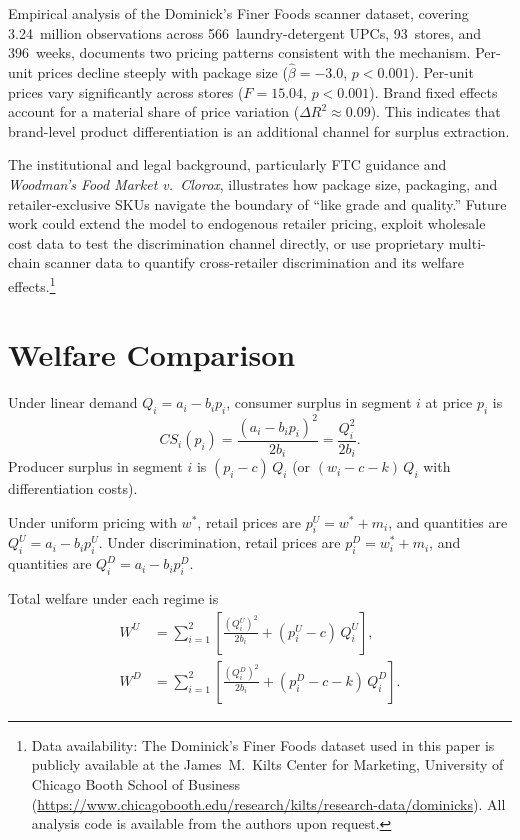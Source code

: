 \documentclass[12pt]{article}
\theoremstyle{definition}
\begin{document}
Empirical analysis of the Dominick's Finer Foods scanner dataset, covering 3.24~million observations across 566~laundry-detergent UPCs, 93~stores, and 396~weeks, documents two pricing patterns consistent with the mechanism.
Per-unit prices decline steeply with package size ($\hat{\beta} = -3.0$, $p < 0.001$).
Per-unit prices vary significantly across stores ($F = 15.04$, $p < 0.001$).
Brand fixed effects account for a material share of price variation ($\Delta R^2 \approx 0.09$). This indicates that brand-level product differentiation is an additional channel for surplus extraction.

The institutional and legal background, particularly FTC guidance and \textit{Woodman's Food Market v.\ Clorox}, illustrates how package size, packaging, and retailer-exclusive SKUs navigate the boundary of ``like grade and quality.''
Future work could extend the model to endogenous retailer pricing, exploit wholesale cost data to test the discrimination channel directly, or use proprietary multi-chain scanner data to quantify cross-retailer discrimination and its welfare effects.\footnote{Data availability: The Dominick's Finer Foods dataset used in this paper is publicly available at the James~M.\ Kilts Center for Marketing, University of Chicago Booth School of Business (\url{https://www.chicagobooth.edu/research/kilts/research-data/dominicks}). All analysis code is available from the authors upon request.}


\appendix

\section{Welfare Comparison}\label{app:welfare}

Under linear demand $Q_i = a_i - b_i p_i$, consumer surplus in segment $i$ at price $p_i$ is
\begin{equation}\label{eq:cs}
CS_i(p_i) = \frac{(a_i - b_i p_i)^2}{2b_i} = \frac{Q_i^2}{2b_i}.
\end{equation}
Producer surplus in segment $i$ is $(p_i - c)\,Q_i$ (or $(w_i - c - k)\,Q_i$ with differentiation costs).

Under uniform pricing with $w^*$, retail prices are $p_i^U = w^* + m_i$, and quantities are $Q_i^U = a_i - b_i p_i^U$.
Under discrimination, retail prices are $p_i^D = w_i^* + m_i$, and quantities are $Q_i^D = a_i - b_i p_i^D$.

Total welfare under each regime is
\begin{align}
W^U &= \sum_{i=1}^{2}\left[\frac{(Q_i^U)^2}{2b_i} + (p_i^U - c)\,Q_i^U\right], \label{eq:wu}\\[6pt]
W^D &= \sum_{i=1}^{2}\left[\frac{(Q_i^D)^2}{2b_i} + (p_i^D - c - k)\,Q_i^D\right]. \label{eq:wd}
\end{align}
\end{document}

